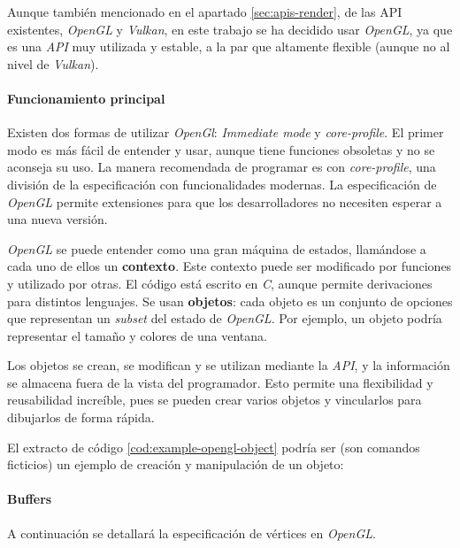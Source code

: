 Aunque también mencionado en el apartado \ref{sec:apis-render}, de las API existentes, \textit{OpenGL} y \textit{Vulkan}, en este trabajo se ha decidido usar \textit{OpenGL}, ya que es una \textit{API} muy utilizada y estable, a la par que altamente flexible (aunque no al nivel de \textit{Vulkan}).

\paragraph{Funcionamiento principal} \label{par:ogl-introduction}

Existen dos formas de utilizar \textit{OpenGl}: \textit{Immediate mode} y \textit{core-profile}. El primer modo es más fácil de entender y usar, aunque tiene funciones obsoletas y no se aconseja su uso. La manera recomendada de programar es con \textit{core-profile}, una división de la especificación con funcionalidades modernas. La especificación de \textit{OpenGL} permite extensiones para que los desarrolladores no necesiten esperar a una nueva versión.

\textit{OpenGL} se puede entender como una gran máquina de estados, llamándose a cada uno de ellos un \textbf{contexto}. Este contexto puede ser modificado por funciones y utilizado por otras. El código está escrito en \textit{C}, aunque permite derivaciones para distintos lenguajes. Se usan \textbf{objetos}: cada objeto es un conjunto de opciones que representan un \textit{subset} del estado de \textit{OpenGL}. Por ejemplo, un objeto podría representar el tamaño y colores de una ventana.

Los objetos se crean, se modifican y se utilizan mediante la \textit{API}, y la información se almacena fuera de la vista del programador. Esto permite una flexibilidad y reusabilidad increíble, pues se pueden crear varios objetos y vincularlos para dibujarlos de forma rápida.

El extracto de código \ref{cod:example-opengl-object} podría ser (son comandos ficticios) un ejemplo de creación y manipulación de un objeto:


\paragraph{Buffers} \label{par:ogl-buffers}

A continuación se detallará la especificación de vértices \cite{webVertexSpecDocs} en \textit{OpenGL}.

